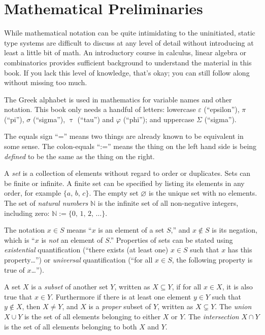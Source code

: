 \documentclass[../generics]{subfiles}
\begin{document}
\section*{Mathematical Preliminaries}

While mathematical notation can be quite intimidating to the uninitiated, static type systems are difficult to discuss at any level of detail without introducing at least a little bit of math. An introductory course in calculus, linear algebra or combinatorics provides sufficient background to understand the material in this book. If you lack this level of knowledge, that's okay; you can still follow along without missing too much.

The Greek alphabet is used in mathematics for variable names and other notation. This book only needs a handful of letters: lowercase $\varepsilon$ (``epsilon''), $\pi$ (``pi''), $\sigma$ (``sigma''), $\uptau$ (``tau'') and $\varphi$ (``phi''); and uppercase $\Sigma$ (``sigma'').

The equals sign ``='' means two things are already known to be equivalent in some sense. The colon-equals ``:='' means the thing on the left hand side is being \emph{defined} to be the same as the thing on the right.

A \emph{set} is a collection of elements without regard to order or duplicates. Sets can be finite or infinite. A finite set can be specified by listing its elements in any order, for example $\{a,\,b,\,c\}$. The empty set \index{$\varnothing$}$\varnothing$ is the unique set with no elements. The set of \emph{natural numbers} $\mathbb{N}$ is the infinite set of all non-negative integers, including zero: $\mathbb{N}:=\{0,\,1,\,2,\,\ldots\}$.

The notation \index{$\in$}$x\in S$ means ``$x$ is an element of a set $S$,'' and \index{$\not\in$}$x\not\in S$ is its negation, which is ``$x$ is \emph{not} an element of $S$.'' Properties of sets can be stated using \emph{existential} quantification (``there exists (at least one) $x\in S$ such that $x$ has this property\ldots'') or \emph{universal} quantification (``for all $x\in S$, the following property is true of $x$\ldots'').

%
%
A set $X$ is a \emph{subset} of another set $Y$, written as \index{$\subseteq$}$X\subseteq Y$, if for all $x\in X$, it is also true that $x\in Y$. Furthermore if there is at least one element $y\in Y$ such that $y\not\in X$, then $X\neq Y$, and $X$ is a \emph{proper} subset of $Y$, written as \index{$\subsetneq$}$X\subsetneq Y$. The \emph{union} \index{$\cup$}$X\cup Y$ is the set of all elements belonging to either $X$ or $Y$. The \emph{intersection} \index{$\cap$}$X\cap Y$ is the set of all elements belonging to both $X$ and $Y$.
\end{document}
